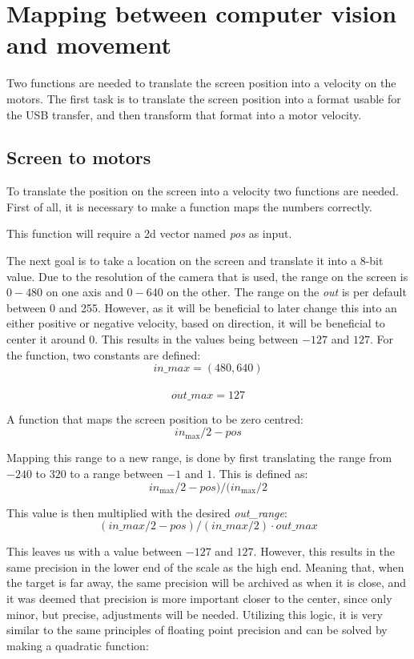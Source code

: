 \section{Mapping between computer vision and movement}
Two functions are needed to translate the screen position into a velocity on the motors.
The first task is to translate the screen position into a format usable for the USB transfer, and then transform that format into a motor velocity.

\subsection{Screen to motors}
To translate the position on the screen into a velocity two functions are needed.
First of all, it is necessary to make a function maps the numbers correctly.

This function will require a 2d vector named \textit{pos} as input.

The next goal is to take a location on the screen and translate it into a 8-bit value.
Due to the resolution of the camera that is used, the range on the screen is $0 - 480$ on one axis and $0 - 640$ on the other.
The range on the \textit{out}  is per default between 0 and 255.
However, as it will be beneficial to later change this into an either positive or negative velocity, based on direction, it will be beneficial to center it around 0.
This results in the values being between $-127$ and $127$.
For the function, two constants are defined:\\
$$in\_max = (480,640)$$\\
$$out\_max = 127$$

A function that maps the screen position to be zero centred: 
$$
in_\text{max}/2 - pos
$$

Mapping this range to a new range, is done by first translating the range from $-240$ to $320$ to a range between $-1$ and $1$.
This is defined as:
$$
in_\text{max}/2 - pos)/(in_\text{max}/2
$$


This value is then multiplied with the desired \textit{out\_range}:
$$
(in\_max/2 - pos)/(in\_max/2) \cdot out\_max
$$

This leaves us with a value between $-127$ and $127$. 
However, this results in the same precision in the lower end of the scale as the high end.
Meaning that, when the target is far away, the same precision will be archived as when it is close, and it was deemed that precision is more important closer to the center, since only minor, but precise, adjustments will be needed.
Utilizing this logic, it is very similar to the same principles of floating point precision and can be solved by making a quadratic function:

